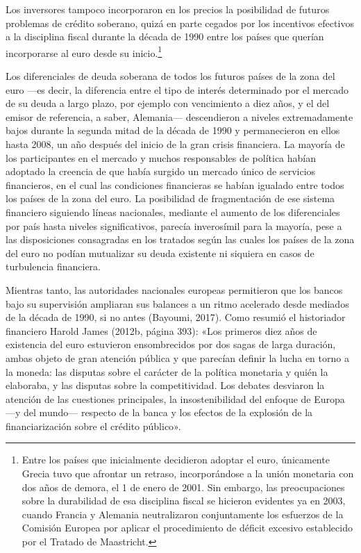 \documentclass[10pt,a4paper]{article}
\begin{document}
{Los inversores tampoco incorporaron en los precios la posibilidad de futuros problemas de crédito soberano, quizá en parte cegados por los incentivos efectivos a la disciplina fiscal durante la década de 1990 entre los países que querían incorporarse al euro desde su inicio.\footnote{%
    Entre los países que inicialmente decidieron adoptar el euro, únicamente Grecia tuvo que afrontar un retraso, incorporándose a la unión monetaria con dos años de demora, el 1 de enero de 2001. Sin embargo, las preocupaciones sobre la durabilidad de esa disciplina fiscal se hicieron evidentes ya en 2003, cuando Francia y Alemania neutralizaron conjuntamente los esfuerzos de la Comisión Europea por aplicar el procedimiento de déficit excesivo establecido por el Tratado de Maastricht.
}

Los diferenciales de deuda soberana de todos los futuros países de la zona del euro —es decir, la diferencia entre el tipo de interés determinado por el mercado de su deuda a largo plazo, por ejemplo con vencimiento a diez años, y el del emisor de referencia, a saber, Alemania— descendieron a niveles extremadamente bajos durante la segunda mitad de la década de 1990 y permanecieron en ellos hasta 2008, un año después del inicio de la gran crisis financiera. La mayoría de los participantes en el mercado y muchos responsables de política habían adoptado la creencia de que había surgido un mercado único de servicios financieros, en el cual las condiciones financieras se habían igualado entre todos los países de la zona del euro. La posibilidad de fragmentación de ese sistema financiero siguiendo líneas nacionales, mediante el aumento de los diferenciales por país hasta niveles significativos, parecía inverosímil para la mayoría, pese a las disposiciones consagradas en los tratados según las cuales los países de la zona del euro no podían mutualizar su deuda existente ni siquiera en casos de turbulencia financiera.

Mientras tanto, las autoridades nacionales europeas permitieron que los bancos bajo su supervisión ampliaran sus balances a un ritmo acelerado desde mediados de la década de 1990, si no antes (Bayoumi, 2017). Como resumió el historiador financiero Harold James (2012b, página 393): «Los primeros diez años de existencia del euro estuvieron ensombrecidos por dos sagas de larga duración, ambas objeto de gran atención pública y que parecían definir la lucha en torno a la moneda: las disputas sobre el carácter de la política monetaria y quién la elaboraba, y las disputas sobre la competitividad. Los debates desviaron la atención de las cuestiones principales, la insostenibilidad del enfoque de Europa —y del mundo— respecto de la banca y los efectos de la explosión de la financiarización sobre el crédito público».

}
\end{document}
